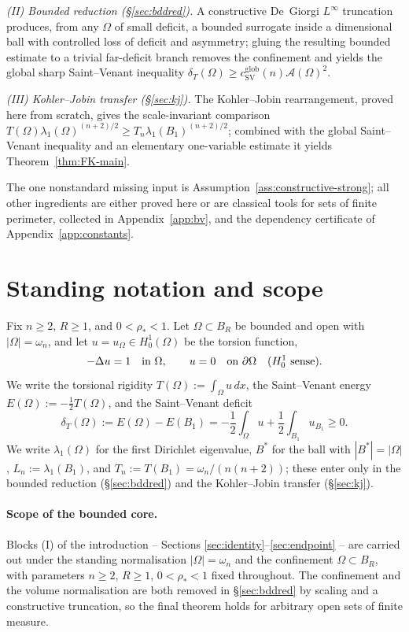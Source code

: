 \documentclass[11pt]{amsart}
\theoremstyle{definition}
\newcommand{\Om}{\Omega}
\newcommand{\Fr}{\mathcal A}
\newcommand{\dT}{\delta_T}
\newcommand{\rstar}{\rho_*}
\newcommand{\Bstar}{B^*}
\begin{document}
\emph{(II) Bounded reduction (\S\ref{sec:bddred}).}
A constructive De~Giorgi \(L^\infty\) truncation produces, from any \(\Om\) of
small deficit, a bounded surrogate inside a dimensional ball with controlled
loss of deficit and asymmetry; gluing the resulting bounded estimate to a
trivial far-deficit branch removes the confinement and yields the global sharp
Saint--Venant inequality \(\dT(\Om)\ge c_{\mathrm{SV}}^{\mathrm{glob}}(n)
\Fr(\Om)^2\).

\emph{(III) Kohler--Jobin transfer (\S\ref{sec:kj}).}
The Kohler--Jobin rearrangement, proved here from scratch, gives the
scale-invariant comparison \(T(\Om)\lambda_1(\Om)^{(n+2)/2}\ge
T_n\lambda_1(B_1)^{(n+2)/2}\); combined with the global Saint--Venant inequality
and an elementary one-variable estimate it yields Theorem~\ref{thm:FK-main}.

The one nonstandard missing input is Assumption~\ref{ass:constructive-strong};
all other ingredients are either proved here or are classical tools for sets of
finite perimeter, collected in Appendix~\ref{app:bv}, and the dependency
certificate of Appendix~\ref{app:constants}.

\section{Standing notation and scope}\label{sec:notation}

Fix \(n\ge2\), \(R\ge1\), and \(0<\rstar<1\).  Let
\(\Om\subset B_R\) be bounded and open with \(|\Om|=\omega_n\), and let
\(u=u_\Om\in H^1_0(\Om)\) be the torsion function,
\[
   -\Delta u=1\quad\hbox{in }\Om,\qquad u=0\quad\hbox{on }\partial\Om
   \quad(H^1_0\hbox{ sense}).
\]
We write the torsional rigidity \(T(\Om):=\int_\Om u\,dx\), the Saint--Venant
energy \(E(\Om):=-\tfrac12 T(\Om)\), and the Saint--Venant deficit
\[
   \dT(\Om):=E(\Om)-E(B_1)
   =-\frac12\int_\Om u+\frac12\int_{B_1}u_{B_1}\ge0.
\]
We write \(\lambda_1(\Om)\) for the first Dirichlet eigenvalue, \(\Bstar\) for
the ball with \(|\Bstar|=|\Om|\), \(L_n:=\lambda_1(B_1)\), and
\(T_n:=T(B_1)=\omega_n/(n(n+2))\); these enter only in the bounded reduction
(\S\ref{sec:bddred}) and the Kohler--Jobin transfer (\S\ref{sec:kj}).

\paragraph{Scope of the bounded core.}  Blocks (I) of the introduction --
Sections \ref{sec:identity}--\ref{sec:endpoint} -- are carried out under the
standing normalisation \(|\Om|=\omega_n\) and the confinement
\(\Om\subset B_R\), with parameters \(n\ge2\), \(R\ge1\), \(0<\rstar<1\) fixed
throughout.  The confinement and the volume normalisation are both removed in
\S\ref{sec:bddred} by scaling and a constructive truncation, so the final
theorem holds for arbitrary open sets of finite measure.
\end{document}
